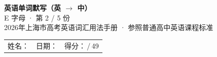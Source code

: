 \documentclass[10pt,a4paper]{article}
\begin{document}
\pagestyle{plain}

\begin{center}
{\LARGE\bfseries 英语单词默写（英 $\to$ 中）}\\[0.22em]
{\large E 字母 · 第 2 / 5 份}\\[0.18em]
{\small 2026年上海市高考英语词汇用法手册 · 参照普通高中英语课程标准}
\end{center}

\vspace{0.25em}
\noindent\begin{tabular}{@{}p{}@{}p{}@{}p{}@{}}
姓名：\underline{\hspace{2.0cm}} & 日期：\underline{\hspace{2.0cm}} & 得分：\underline{\hspace{1.3cm}}\,/\,49 \\
\end{tabular}

\vspace{0.3em}

\vspace{0.08em}
\end{document}
